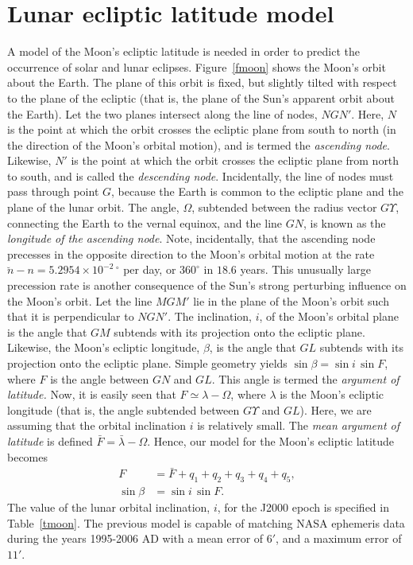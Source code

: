 \section{Lunar ecliptic latitude model}
A model of the Moon's ecliptic latitude is needed in order to predict the
occurrence of solar and lunar eclipses. Figure~\ref{fmoon} shows the
Moon's orbit about the Earth. The plane of this orbit is fixed, but slightly tilted with
respect to the plane of the ecliptic (that is, the plane of the Sun's
apparent orbit about the Earth). Let the two planes intersect along the
line of nodes, $NGN'$. Here, $N$ is the point at which the orbit crosses the
ecliptic plane from south to north (in the direction of the Moon's orbital
motion), and is termed the {\em ascending node}. Likewise, $N'$ is the
point at which the orbit crosses the ecliptic plane from north to south,
and is called the {\em descending node}. Incidentally, the line of nodes must pass through point $G$, because the Earth is common to the ecliptic plane and the plane of the lunar orbit.
The angle, $\Omega$, subtended between
 the radius vector $G\Upsilon$, connecting the Earth to the vernal equinox,
and the line $GN$, is known as the {\em longitude of the ascending node}. Note, incidentally, that
the ascending node precesses in the opposite direction to the Moon's orbital motion
at the rate  $\breve{n}-n = 5.2954\times 10^{-2}\,^\circ$ per day, or $360^\circ$ in $18.6$ years. 
This unusually large precession rate is another consequence of the Sun's strong perturbing influence on the
Moon's orbit.
Let the line $MGM'$ lie in the plane
of the Moon's orbit such that it is perpendicular to $NGN'$.
The inclination, $i$,  of the Moon's orbital plane is the angle
that $GM$ subtends with its projection onto the ecliptic plane. Likewise, the
Moon's ecliptic longitude, $\beta$, is the angle that $GL$ subtends with its
projection onto the ecliptic plane.
Simple geometry
yields $\sin\beta = \sin i\,\sin F$, where $F$ is the angle
between $GN$ and $GL$. This angle is termed the {\em argument of latitude.} 
Now, it is easily seen that $F \simeq \lambda-\Omega$, where $\lambda$
is the Moon's ecliptic longitude (that is, the angle subtended
between  $G\Upsilon$ and $GL$). Here, we are assuming that the orbital
inclination $i$ is relatively
small. The {\em mean argument of latitude}\/ is defined $\bar{F} = \bar{\lambda}-\Omega$. 
 Hence, our model for the Moon's ecliptic latitude becomes
\begin{align}
F &=\bar{F}+q_1+q_2+q_3+q_4+q_5,\\[0.5ex]
\sin\beta &= \sin i\,\sin F.\label{emoonlat}
\end{align}
The value of the lunar orbital inclination, $i$,  for the
J2000 epoch is specified in Table~\ref{tmoon}. The previous model is capable of
matching NASA ephemeris data during the years 1995-2006 AD with
a mean error of $6'$, and a maximum error of $11'$.

